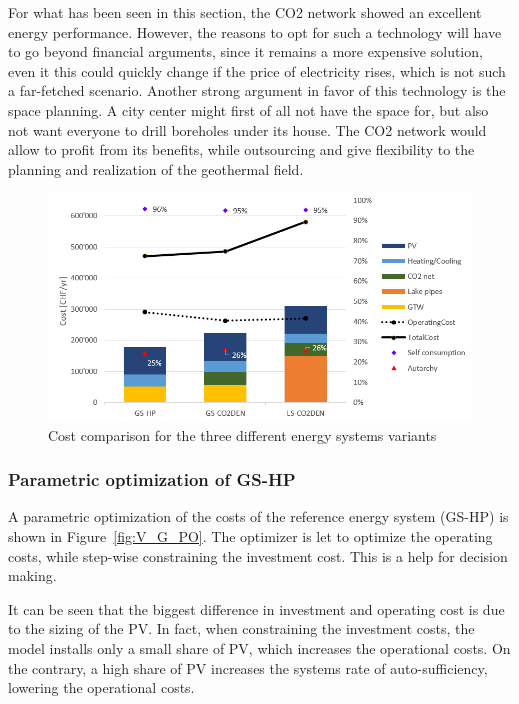 \documentclass{article}
\begin{document}
For what has been seen in this section, the CO2 network showed an excellent energy performance. However, the reasons to opt for such a technology will have to go beyond financial arguments, since it remains a more expensive solution, even it this could quickly change if the price of electricity rises, which is not such a far-fetched scenario. Another strong argument in favor of this technology is the space planning. A city center might first of all not have the space for, but also not want everyone to drill boreholes under its house. The CO2 network would allow to profit from its benefits, while outsourcing and give flexibility to the planning and realization of the geothermal field.

\begin{figure}[htp]
	\centering
	\includegraphics[width=1\textwidth]{V_costs.PNG}
	\caption{Cost comparison for the three different energy systems variants}
	\label{fig:V_costs}
\end{figure}


\subsubsection{Parametric optimization of GS-HP}
A parametric optimization of the costs of the reference energy system (GS-HP) is shown in Figure~\ref{fig:V_G_PO}. The optimizer is let to optimize the operating costs, while step-wise constraining the investment cost. This is a help for decision making.

It can be seen that the biggest difference in investment and operating cost is due to the sizing of the PV. In fact, when constraining the investment costs, the model installs only a small share of PV, which increases the operational costs. On the contrary, a high share of PV increases the systems rate of auto-sufficiency, lowering the operational costs. 
\end{document}
